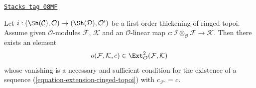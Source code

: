 \begin{lemma}
\label{defos-lemma-inf-obs-ext-ringed-topoi}
\href{https://stacks.math.columbia.edu/tag/08MF}{\texttt{Stacks tag 08MF}}

Let $i : (\Sh(\mathcal{C}), \mathcal{O}) \to (\Sh(\mathcal{D}), \mathcal{O}')$
be a first order thickening of ringed topoi. Assume given
$\mathcal{O}$-modules $\mathcal{F}$, $\mathcal{K}$
and an $\mathcal{O}$-linear map
$c : \mathcal{I} \otimes_\mathcal{O} \mathcal{F} \to \mathcal{K}$.
Then there exists an element
$$
o(\mathcal{F}, \mathcal{K}, c) \in
\Ext^2_\mathcal{O}(\mathcal{F}, \mathcal{K})
$$
whose vanishing is a necessary and sufficient condition for the existence
of a sequence (\ref{equation-extension-ringed-topoi})
with $c_{\mathcal{F}'} = c$.
\end{lemma}

